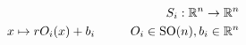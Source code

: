 \documentclass[preview]{standalone}
\begin{document}
\begin{align*}
S_i : \mathbb{R}^n \to \mathbb{R}^n \\ x \mapsto r O_i(x) + b_i\hspace{1 cm} O_i \in \text{SO}(n), b_i \in \mathbb{R}^n \\
\end{align*}
\end{document}
